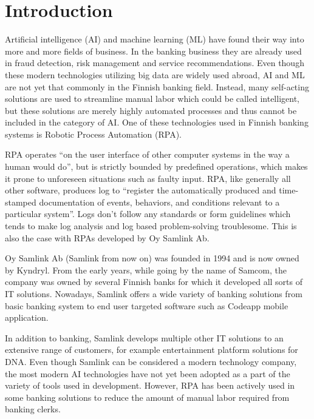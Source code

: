 

\section{Introduction}\label{sec:introduction}

\thispagestyle{empty}

Artificial intelligence (AI) and machine learning (ML)
have found their way into
more and more fields of business.
In the banking business they are already used in
fraud detection, risk management and service recommendations.\cite{donepudi2017machine}
Even though these
modern technologies utilizing big data
are widely used abroad,
AI and ML are not yet that commonly in the Finnish banking field.
Instead,
many self-acting solutions are used
to streamline manual labor
which could be called intelligent,
but these solutions are merely highly automated processes
and thus cannot be included in the category of AI.\@
One of these technologies used in Finnish banking systems
is Robotic Process Automation (RPA).

RPA operates \enquote{on the user interface of other computer systems
in the way a human would do},\cite{van2018robotic}
but is strictly bounded by predefined operations,
which makes it prone to unforeseen situations
such as faulty input.
RPA, like generally all other software,
produces log to \enquote{register
the automatically produced and time-stamped documentation
of events, behaviors, and conditions
relevant to a particular system}\cite{delarosa2018log}.
Logs don't follow any standards or form guidelines
which tends to make
log analysis and log based problem-solving troublesome.
This is also the case with RPAs developed by Oy Samlink Ab.

Oy Samlink Ab (Samlink from now on)
was founded in 1994
and is now owned by Kyndryl.
From the early years,
while going by the name of Samcom,
the company was owned by several Finnish banks
for which it developed all sorts of IT solutions.
Nowadays,
Samlink offers a wide variety of banking solutions
from basic banking system to end user targeted software
such as Codeapp mobile application.

In addition to banking,
Samlink develops multiple other IT solutions
to an extensive range of customers,
for example
entertainment platform solutions for DNA\@.
Even though Samlink can be considered
a modern technology company,
the most modern AI technologies have not yet been adopted
as a part of the variety of tools used in development.
However,
RPA has been actively used
in some banking solutions
to reduce the amount of manual labor required
from banking clerks.

